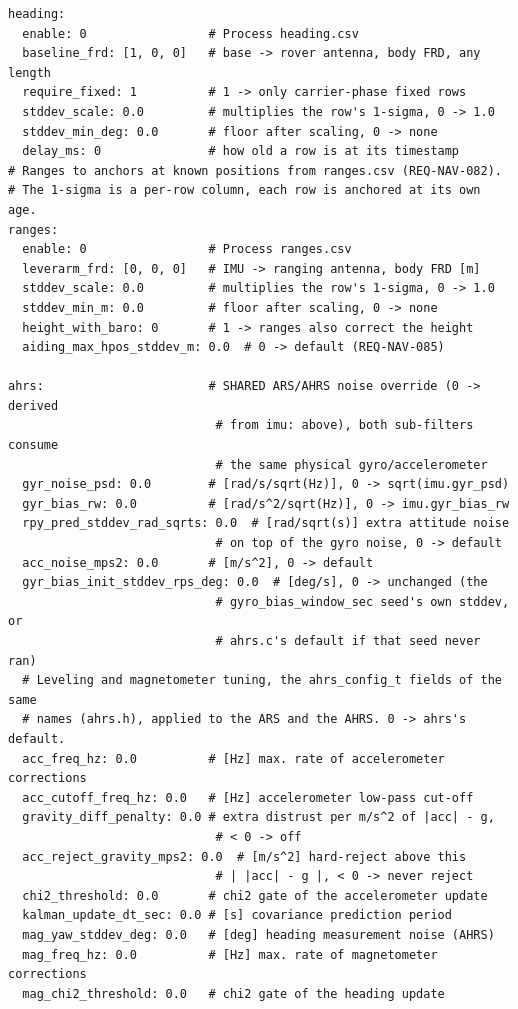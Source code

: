 \documentclass[11pt,a4paper]{article}
\begin{document}
\begin{lstlisting}[style=cfg]
heading:
  enable: 0                 # Process heading.csv
  baseline_frd: [1, 0, 0]   # base -> rover antenna, body FRD, any length
  require_fixed: 1          # 1 -> only carrier-phase fixed rows
  stddev_scale: 0.0         # multiplies the row's 1-sigma, 0 -> 1.0
  stddev_min_deg: 0.0       # floor after scaling, 0 -> none
  delay_ms: 0               # how old a row is at its timestamp
# Ranges to anchors at known positions from ranges.csv (REQ-NAV-082).
# The 1-sigma is a per-row column, each row is anchored at its own age.
ranges:
  enable: 0                 # Process ranges.csv
  leverarm_frd: [0, 0, 0]   # IMU -> ranging antenna, body FRD [m]
  stddev_scale: 0.0         # multiplies the row's 1-sigma, 0 -> 1.0
  stddev_min_m: 0.0         # floor after scaling, 0 -> none
  height_with_baro: 0       # 1 -> ranges also correct the height
  aiding_max_hpos_stddev_m: 0.0  # 0 -> default (REQ-NAV-085)

ahrs:                       # SHARED ARS/AHRS noise override (0 -> derived
                             # from imu: above), both sub-filters consume
                             # the same physical gyro/accelerometer
  gyr_noise_psd: 0.0        # [rad/s/sqrt(Hz)], 0 -> sqrt(imu.gyr_psd)
  gyr_bias_rw: 0.0          # [rad/s^2/sqrt(Hz)], 0 -> imu.gyr_bias_rw
  rpy_pred_stddev_rad_sqrts: 0.0  # [rad/sqrt(s)] extra attitude noise
                             # on top of the gyro noise, 0 -> default
  acc_noise_mps2: 0.0       # [m/s^2], 0 -> default
  gyr_bias_init_stddev_rps_deg: 0.0  # [deg/s], 0 -> unchanged (the
                             # gyro_bias_window_sec seed's own stddev, or
                             # ahrs.c's default if that seed never ran)
  # Leveling and magnetometer tuning, the ahrs_config_t fields of the same
  # names (ahrs.h), applied to the ARS and the AHRS. 0 -> ahrs's default.
  acc_freq_hz: 0.0          # [Hz] max. rate of accelerometer corrections
  acc_cutoff_freq_hz: 0.0   # [Hz] accelerometer low-pass cut-off
  gravity_diff_penalty: 0.0 # extra distrust per m/s^2 of |acc| - g,
                             # < 0 -> off
  acc_reject_gravity_mps2: 0.0  # [m/s^2] hard-reject above this
                             # | |acc| - g |, < 0 -> never reject
  chi2_threshold: 0.0       # chi2 gate of the accelerometer update
  kalman_update_dt_sec: 0.0 # [s] covariance prediction period
  mag_yaw_stddev_deg: 0.0   # [deg] heading measurement noise (AHRS)
  mag_freq_hz: 0.0          # [Hz] max. rate of magnetometer corrections
  mag_chi2_threshold: 0.0   # chi2 gate of the heading update


\end{lstlisting}
\end{document}
